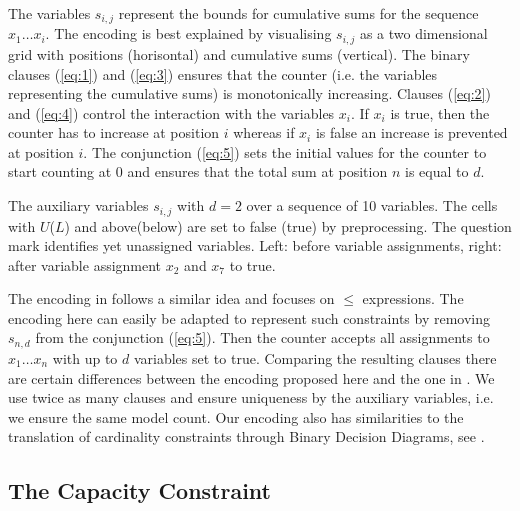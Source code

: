 \documentclass[]{llncs}
\begin{document}
The variables $s_{i,j}$  represent the bounds for cumulative sums for the sequence $x_1 \ldots x_i$. The encoding is
best explained by visualising $s_{i,j}$ as a two dimensional grid with positions (horisontal) and cumulative sums
(vertical). The binary clauses (\ref{eq:1}) and (\ref{eq:3}) ensures that the counter (i.e. the variables representing
the cumulative sums) is monotonically increasing. Clauses (\ref{eq:2}) and (\ref{eq:4}) control the interaction with the
variables $x_i$. If $x_i$ is true, then the counter has to increase at position $i$ whereas if $x_i$ is false an
increase is prevented at position $i$. The conjunction (\ref{eq:5}) sets the initial values for the counter to start
counting at 0 and ensures that the total sum at position $n$ is equal to $d$. 


\begin{example}
The auxiliary variables $s_{i,j}$ with $d=2$ over a sequence of 10 variables. The cells with  $U$($L$) and
above(below) are set to false (true) by preprocessing. The question mark identifies yet unassigned variables. Left:
before variable assignments, right: after variable assignment $x_2$ and $x_7$ to true.
\begin{center}
\begin{minipage}[t]{0.5\textwidth}

\end{minipage}%
\begin{minipage}[t]{0.5\textwidth}

\end{minipage}
\end{center}
\label{ex:1}
\end{example}

The encoding in \cite{Sinz05} follows a similar idea and focuses on $\leq$ expressions. The encoding here can easily be
adapted to represent such constraints by removing $s_{n,d}$ from the conjunction (\ref{eq:5}). Then the counter accepts
all assignments to $x_1 \ldots x_n$ with up to $d$ variables set to true. Comparing the resulting clauses there are
certain differences between the encoding proposed here and the one in \cite{Sinz05}. We use twice as many clauses and
ensure uniqueness by the auxiliary variables, i.e. we ensure the same model count. Our encoding also has similarities to
the translation of cardinality constraints through Binary Decision Diagrams, see \cite{Een06}.

\subsection{The Capacity Constraint}
\label{sub-capacity}
\end{document}
